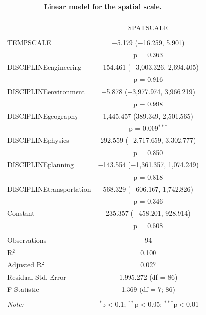 \documentclass[10pt]{article}
\begin{document}
\begin{table}%
\centering 
  \caption{\textbf{Linear model for the spatial scale.}\label{tab:app:modelography:spatscale}}
\begin{tabular}{@{\extracolsep{5pt}}lc} 
\\[-1.8ex]\hline 
\hline \\[-1.8ex] 
\\[-1.8ex] & SPATSCALE \\ 
\hline \\[-1.8ex] 
 TEMPSCALE & $-$5.179 ($-$16.259, 5.901) \\ 
  & p = 0.363 \\ 
  DISCIPLINEengineering & $-$154.461 ($-$3,003.326, 2,694.405) \\ 
  & p = 0.916 \\ 
  DISCIPLINEenvironment & $-$5.878 ($-$3,977.974, 3,966.219) \\ 
  & p = 0.998 \\ 
  DISCIPLINEgeography & 1,445.457 (389.349, 2,501.565) \\ 
  & p = 0.009$^{***}$ \\ 
  DISCIPLINEphysics & 292.559 ($-$2,717.659, 3,302.777) \\ 
  & p = 0.850 \\ 
  DISCIPLINEplanning & $-$143.554 ($-$1,361.357, 1,074.249) \\ 
  & p = 0.818 \\ 
  DISCIPLINEtransportation & 568.329 ($-$606.167, 1,742.826) \\ 
  & p = 0.346 \\ 
  Constant & 235.357 ($-$458.201, 928.914) \\ 
  & p = 0.508 \\ 
 \hline \\[-1.8ex]
Observations & 94 \\ 
R$^{2}$ & 0.100 \\ 
Adjusted R$^{2}$ & 0.027 \\ 
Residual Std. Error & 1,995.272 (df = 86) \\ 
F Statistic &  1.369 (df = 7; 86) \\ 
\hline 
\hline \\[-1.8ex] 
\textit{Note:}  & \multicolumn{1}{r}{$^{*}$p$<$0.1; $^{**}$p$<$0.05; $^{***}$p$<$0.01} \\ 
\end{tabular}
\end{table} 
\end{document}

